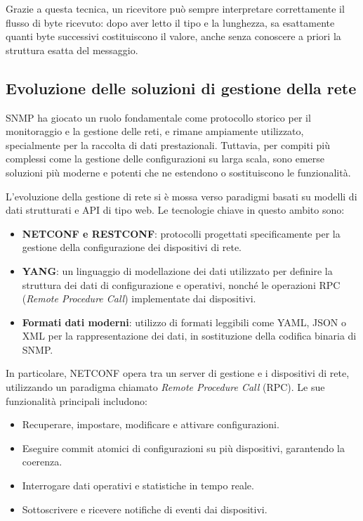 Grazie a questa tecnica, un ricevitore può sempre interpretare correttamente il
flusso di byte ricevuto: dopo aver letto il tipo e la lunghezza, sa esattamente
quanti byte successivi costituiscono il valore, anche senza conoscere a priori
la struttura esatta del messaggio.

\subsection{Evoluzione delle soluzioni di gestione della rete}

SNMP ha giocato un ruolo fondamentale come protocollo storico per il monitoraggio
e la gestione delle reti, e rimane ampiamente utilizzato, specialmente per la
raccolta di dati prestazionali. Tuttavia, per compiti più complessi come la
gestione delle configurazioni su larga scala, sono emerse soluzioni più moderne
e potenti che ne estendono o sostituiscono le funzionalità.

L'evoluzione della gestione di rete si è mossa verso paradigmi basati su modelli
di dati strutturati e API di tipo web. Le tecnologie chiave in questo ambito sono:

\begin{itemize}
\item \textbf{NETCONF e RESTCONF}: protocolli progettati specificamente per la
gestione della configurazione dei dispositivi di rete.
\item \textbf{YANG}: un linguaggio di modellazione dei dati utilizzato per
definire la struttura dei dati di configurazione e operativi, nonché le
operazioni RPC (\textit{Remote Procedure Call}) implementate dai dispositivi.
\item \textbf{Formati dati moderni}: utilizzo di formati leggibili come YAML,
JSON o XML per la rappresentazione dei dati, in sostituzione della codifica
binaria di SNMP.
\end{itemize}

In particolare, NETCONF opera tra un server di gestione e i dispositivi di rete,
utilizzando un paradigma chiamato \textit{Remote Procedure Call} (RPC).
Le sue funzionalità principali includono:
\begin{itemize}
\item Recuperare, impostare, modificare e attivare configurazioni.
\item Eseguire commit atomici di configurazioni su più dispositivi,
garantendo la coerenza.
\item Interrogare dati operativi e statistiche in tempo reale.
\item Sottoscrivere e ricevere notifiche di eventi dai dispositivi.
\end{itemize}


